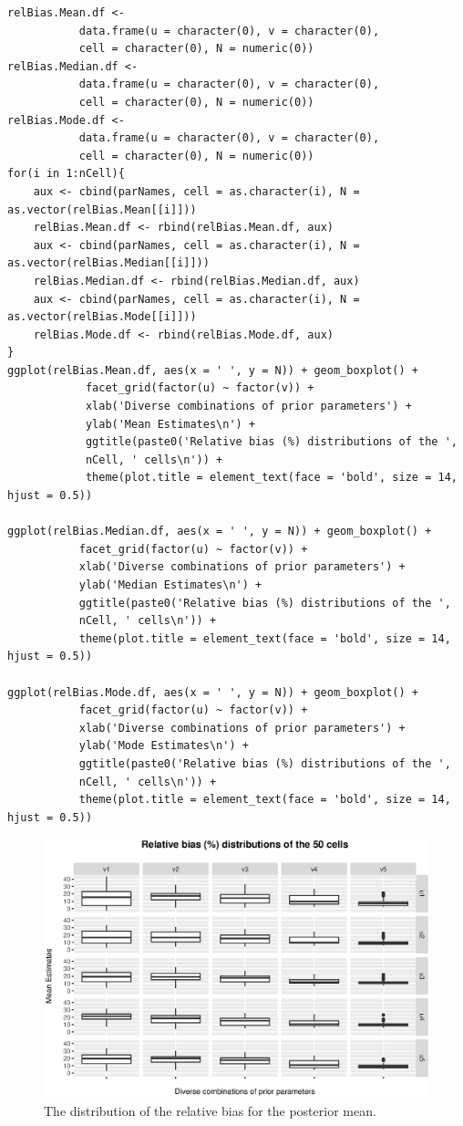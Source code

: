 \documentclass[12pt, a4paper]{article}
\begin{document}
\begin{verbatim}
relBias.Mean.df <- 
           data.frame(u = character(0), v = character(0), 
           cell = character(0), N = numeric(0))
relBias.Median.df <- 
           data.frame(u = character(0), v = character(0), 
           cell = character(0), N = numeric(0))
relBias.Mode.df <- 
           data.frame(u = character(0), v = character(0), 
           cell = character(0), N = numeric(0))
for(i in 1:nCell){
    aux <- cbind(parNames, cell = as.character(i), N = as.vector(relBias.Mean[[i]]))
    relBias.Mean.df <- rbind(relBias.Mean.df, aux)
    aux <- cbind(parNames, cell = as.character(i), N = as.vector(relBias.Median[[i]]))
    relBias.Median.df <- rbind(relBias.Median.df, aux)
    aux <- cbind(parNames, cell = as.character(i), N = as.vector(relBias.Mode[[i]]))
    relBias.Mode.df <- rbind(relBias.Mode.df, aux)
}
ggplot(relBias.Mean.df, aes(x = ' ', y = N)) + geom_boxplot() +
            facet_grid(factor(u) ~ factor(v)) + 
            xlab('Diverse combinations of prior parameters') + 
            ylab('Mean Estimates\n') +
            ggtitle(paste0('Relative bias (%) distributions of the ', 
            nCell, ' cells\n')) +
            theme(plot.title = element_text(face = 'bold', size = 14, hjust = 0.5))

ggplot(relBias.Median.df, aes(x = ' ', y = N)) + geom_boxplot() +
           facet_grid(factor(u) ~ factor(v)) +
           xlab('Diverse combinations of prior parameters') + 
           ylab('Median Estimates\n') +
           ggtitle(paste0('Relative bias (%) distributions of the ', 
           nCell, ' cells\n')) +
           theme(plot.title = element_text(face = 'bold', size = 14, hjust = 0.5))

ggplot(relBias.Mode.df, aes(x = ' ', y = N)) + geom_boxplot() +
           facet_grid(factor(u) ~ factor(v)) +
           xlab('Diverse combinations of prior parameters') + 
           ylab('Mode Estimates\n') +
           ggtitle(paste0('Relative bias (%) distributions of the ', 
           nCell, ' cells\n')) +
           theme(plot.title = element_text(face = 'bold', size = 14, hjust = 0.5))
\end{verbatim}


\begin{figure}
\centering
\includegraphics[scale=0.85]{many-cells-mean.eps}
\caption{The distribution of the relative bias for the posterior mean.}
\label{manycellsmean} 	
\end{figure}
\end{document}
